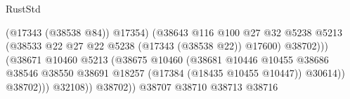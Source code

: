 \begin{lexlean}{RustStd}
\begin{coremodule}
                                                              (@17343 (@38538 @84))
                                                              @17354)
                                                            (@38643
                                                              @116
                                                              @100
                                                              @27
                                                              @32
                                                              @5238
                                                              @5213
                                                              (@38533
                                                                @22
                                                                @27
                                                                @22
                                                                @5238
                                                                (@17343 (@38538 @22))
                                                                @17600)
                                                              @38702)))
                                                        (@38671
                                                          @10460
                                                          @5213
                                                          (@38675
                                                            @10460
                                                            (@38681
                                                              @10446
                                                              @10455
                                                              @38686
                                                              @38546
                                                              @38550
                                                              @38691
                                                              @18257
                                                              (@17384 (@18435 @10455 @10447))
                                                              @30614))
                                                          @38702)))
                                                    @32108))
                                                @38702))
                                            @38707
                                            @38710
                                            @38713
                                            @38716

\end{coremodule}
\end{lexlean}

